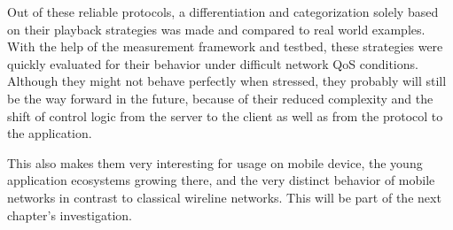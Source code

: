 Out of these reliable protocols, a differentiation and categorization solely based on their playback strategies was made and compared to real world examples. With the help of the measurement framework and testbed, these strategies were quickly evaluated for their behavior under difficult network \gls{QoS} conditions. Although they might not behave perfectly when stressed, they probably will still be the way forward in the future, because of their reduced complexity and the shift of control logic from the server to the client as well as from the protocol to the application.

This also makes them very interesting for usage on mobile device, the young application ecosystems growing there, and the very distinct behavior of mobile networks in contrast to classical wireline networks. This will be part of the next chapter's investigation.










%

 
 

